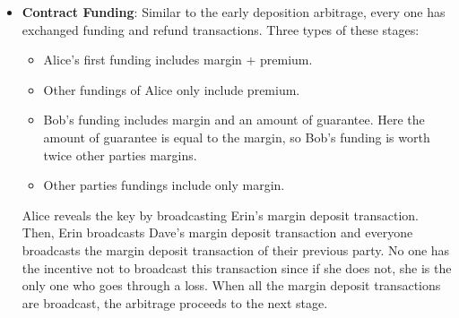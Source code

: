 \begin{itemize}
    \item \textbf{Contract Funding}: Similar to the early deposition arbitrage, every one has exchanged funding and refund transactions. Three types of these stages:
    \begin{itemize}
        \item Alice's first funding includes margin + premium.
        \item Other fundings of Alice only include premium.
        \item Bob's funding includes margin and an amount of guarantee. Here the amount of guarantee is equal to the margin, so Bob's funding is worth twice other parties margins.
        \item Other parties fundings include only margin.
    \end{itemize}
    Alice reveals the \Aone key by broadcasting Erin's margin deposit transaction. Then, Erin broadcasts Dave's margin deposit transaction and everyone broadcasts the margin deposit transaction of their previous party. No one has the incentive not to broadcast this transaction since if she does not, she is the only one who goes through a loss. When all the margin deposit transactions are broadcast, the arbitrage proceeds to the next stage.
    

\end{itemize}
